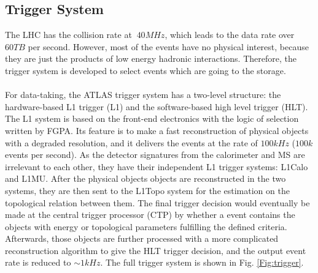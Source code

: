 \subsection{Trigger System}
The LHC has the collision rate at $~40MHz$, which leads to the data rate over $60TB$ per second. However, most of the events have no physical interest, because they are just the products of low energy hadronic interactions. Therefore, the trigger system is developed to select events which are going to the storage.
\\
\\For data-taking, the ATLAS trigger system has a two-level structure: the hardware-based L1 trigger (L1) and the software-based high level trigger (HLT). The L1 system is based on the front-end electronics with the logic of selection written by FGPA. Its feature is to make a fast reconstruction of physical objects with a degraded resolution, and it delivers the events at the rate of $100kHz$ ($100k$ events per second). As the detector signatures from the calorimeter and MS are irrelevant to each other, they have their independent L1 trigger systems: L1Calo and L1MU. After the physical objects objects are reconstructed in the two systems, they are then sent to the L1Topo system for the estimation on the topological relation between them. The final trigger decision would eventually be made at the central trigger processor (CTP) by whether a event contains the objects with energy or topological parameters fulfilling the defined criteria. Afterwards, those objects are further processed with a more complicated reconstruction algorithm to give the HLT trigger decision, and the output event rate is reduced to $\sim 1kHz$. The full trigger system is shown in Fig. \ref{Fig:trigger}.

